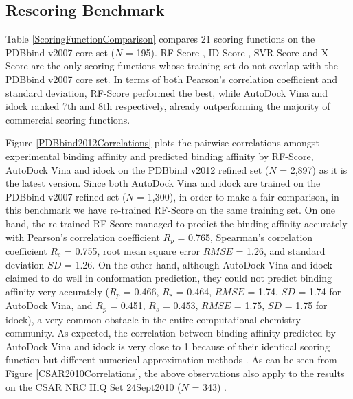 \subsection{Rescoring Benchmark}
Table \ref{ScoringFunctionComparison} compares 21 scoring functions on the PDBbind v2007 core set ($N$ = 195). RF-Score \cite{564}, ID-Score \cite{1305}, SVR-Score \cite{1295} and X-Score \cite{573} are the only scoring functions whose training set do not overlap with the PDBbind v2007 core set. In terms of both Pearson's correlation coefficient and standard deviation, RF-Score performed the best, while AutoDock Vina and idock ranked 7th and 8th respectively, already outperforming the majority of commercial scoring functions.

Figure \ref{PDBbind2012Correlations} plots the pairwise correlations amongst experimental binding affinity and predicted binding affinity by RF-Score, AutoDock Vina and idock on the PDBbind v2012 \cite{529,530} refined set ($N$ = 2,897) as it is the latest version. Since both AutoDock Vina and idock are trained on the PDBbind v2007 refined set ($N$ = 1,300), in order to make a fair comparison, in this benchmark we have re-trained RF-Score on the same training set. On one hand, the re-trained RF-Score managed to predict the binding affinity accurately with Pearson's correlation coefficient $R_p$ = 0.765, Spearman's correlation coefficient $R_s$ = 0.755, root mean square error $RMSE$ = 1.26, and standard deviation $SD$ = 1.26. On the other hand, although AutoDock Vina and idock claimed to do well in conformation prediction, they could not predict binding affinity very accurately ($R_p$ = 0.466, $R_s$ = 0.464, $RMSE$ = 1.74, $SD$ = 1.74 for AutoDock Vina, and $R_p$ = 0.451, $R_s$ = 0.453, $RMSE$ = 1.75, $SD$ = 1.75 for idock), a very common obstacle in the entire computational chemistry community. As expected, the correlation between binding affinity predicted by AutoDock Vina and idock is very close to 1 because of their identical scoring function but different numerical approximation methods \cite{1153}. As can be seen from Figure \ref{CSAR2010Correlations}, the above observations also apply to the results on the CSAR NRC HiQ Set 24Sept2010 ($N$ = 343) \cite{857,960}.

